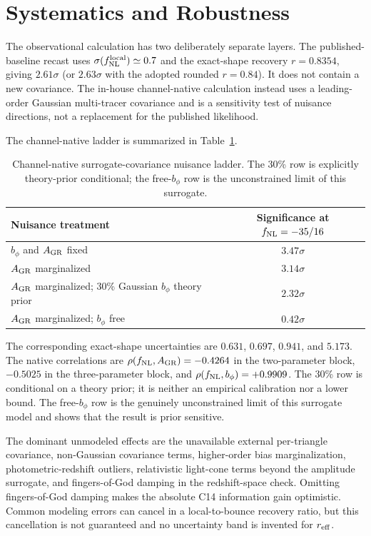 \documentclass[aps,prd,twocolumn,superscriptaddress,showpacs,preprintnumbers,nofootinbib,longbibliography,floatfix]{revtex4-2}
\newcommand{\fnl}{f_{\rm NL}}
\begin{document}
\section{Systematics and Robustness}
\label{sec:systematics}

The observational calculation has two deliberately separate layers. The published-baseline recast uses $\sigma(\fnl^{\rm local})\simeq0.7$ and the exact-shape recovery $r=0.8354$, giving $2.61\sigma$ (or $2.63\sigma$ with the adopted rounded $r=0.84$). It does not contain a new covariance. The in-house channel-native calculation instead uses a leading-order Gaussian multi-tracer covariance and is a sensitivity test of nuisance directions, not a replacement for the published likelihood.

The channel-native ladder is summarized in Table~\ref{tab:nuisance-ladder}.
\begin{table}[t]
\centering
\caption{Channel-native surrogate-covariance nuisance ladder. The 30\% row is explicitly theory-prior conditional; the free-$b_\phi$ row is the unconstrained limit of this surrogate.}
\label{tab:nuisance-ladder}
\begin{tabular}{lc}
\toprule
Nuisance treatment & Significance at $\fnl=-35/16$ \\
\midrule
$b_\phi$ and $A_{\rm GR}$ fixed & $3.47\sigma$ \\
$A_{\rm GR}$ marginalized & $3.14\sigma$ \\
$A_{\rm GR}$ marginalized; 30\% Gaussian $b_\phi$ theory prior & $2.32\sigma$ \\
$A_{\rm GR}$ marginalized; $b_\phi$ free & $0.42\sigma$ \\
\bottomrule
\end{tabular}
\end{table}
The corresponding exact-shape uncertainties are $0.631$, $0.697$, $0.941$, and $5.173$. The native correlations are $\rho(\fnl,A_{\rm GR})=-0.4264$ in the two-parameter block, $-0.5025$ in the three-parameter block, and $\rho(\fnl,b_\phi)=+0.9909$. The 30\% row is conditional on a theory prior; it is neither an empirical calibration nor a lower bound. The free-$b_\phi$ row is the genuinely unconstrained limit of this surrogate model and shows that the result is prior sensitive.

The dominant unmodeled effects are the unavailable external per-triangle covariance, non-Gaussian covariance terms, higher-order bias marginalization, photometric-redshift outliers, relativistic light-cone terms beyond the amplitude surrogate, and fingers-of-God damping in the redshift-space check. Omitting fingers-of-God damping makes the absolute C14 information gain optimistic. Common modeling errors can cancel in a local-to-bounce recovery ratio, but this cancellation is not guaranteed and no uncertainty band is invented for $r_{\rm eff}$.
\end{document}
